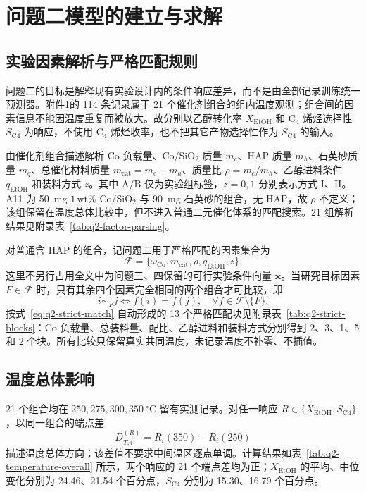 \section{问题二模型的建立与求解}

\subsection{实验因素解析与严格匹配规则}

问题二的目标是解释现有实验设计内的条件响应差异，而不是由全部记录训练统一预测器。附件1的 114 条记录属于 21 个催化剂组合的组内温度观测；组合间的因素信息不能因温度重复而被放大。故分别以乙醇转化率 $X_{\mathrm{EtOH}}$ 和 $\mathrm{C}_4$ 烯烃选择性 $S_{\mathrm{C4}}$ 为响应，不使用 $\mathrm{C}_4$ 烯烃收率，也不把其它产物选择性作为 $S_{\mathrm{C4}}$ 的输入。

由催化剂组合描述解析 Co 负载量、$\mathrm{Co/SiO_2}$ 质量 $m_c$、HAP 质量 $m_h$、石英砂质量 $m_q$、总催化材料质量 $m_{\mathrm{cat}}=m_c+m_h$、质量比 $\rho=m_c/m_h$、乙醇进料条件 $q_{\mathrm{EtOH}}$ 和装料方式 $z$。其中 A/B 仅为实验组标签，$z=0,1$ 分别表示方式 I、II。A11 为 \SI{50}{\milli\gram} $1\,\mathrm{wt}\%$ $\mathrm{Co/SiO_2}$ 与 \SI{90}{\milli\gram} 石英砂的组合，无 HAP，故 $\rho$ 不定义；该组保留在温度总体比较中，但不进入普通二元催化体系的匹配搜索。21 组解析结果见附录表~\ref{tab:q2-factor-parsing}。

对普通含 HAP 的组合，记问题二用于严格匹配的因素集合为
\begin{equation}
 \mathcal{F}=\{\omega_{\mathrm{Co}},m_{\mathrm{cat}},\rho,q_{\mathrm{EtOH}},z\}.
 \label{eq:q2-factor-set}
\end{equation}
这里不另行占用全文中为问题三、四保留的可行实验条件向量 $\bm{x}$。当研究目标因素 $F\in\mathcal{F}$ 时，只有其余四个因素完全相同的两个组合才可比较，即
\begin{equation}
 i\sim_F j
 \Longleftrightarrow
 f(i)=f(j),\quad \forall f\in\mathcal{F}\setminus\{F\}.
 \label{eq:q2-strict-match}
\end{equation}
按式~\eqref{eq:q2-strict-match} 自动形成的 13 个严格匹配块见附录表~\ref{tab:q2-strict-blocks}：Co 负载量、总装料量、配比、乙醇进料和装料方式分别得到 2、3、1、5 和 2 个块。所有比较只保留真实共同温度，未记录温度不补零、不插值。

\subsection{温度总体影响}

21 个组合均在 $250,275,300,350\ ^\circ\mathrm{C}$ 留有实测记录。对任一响应 $R\in\{X_{\mathrm{EtOH}},S_{\mathrm{C4}}\}$，以同一组合的端点差
\begin{equation}
 D_{T,i}^{(R)}=R_i(350)-R_i(250)
 \label{eq:q2-temperature-difference}
\end{equation}
描述温度总体方向；该差值不要求中间温区逐点单调。计算结果如表~\ref{tab:q2-temperature-overall} 所示，两个响应的 21 个端点差均为正；$X_{\mathrm{EtOH}}$ 的平均、中位变化分别为 24.46、21.54 个百分点，$S_{\mathrm{C4}}$ 分别为 15.30、16.79 个百分点。


